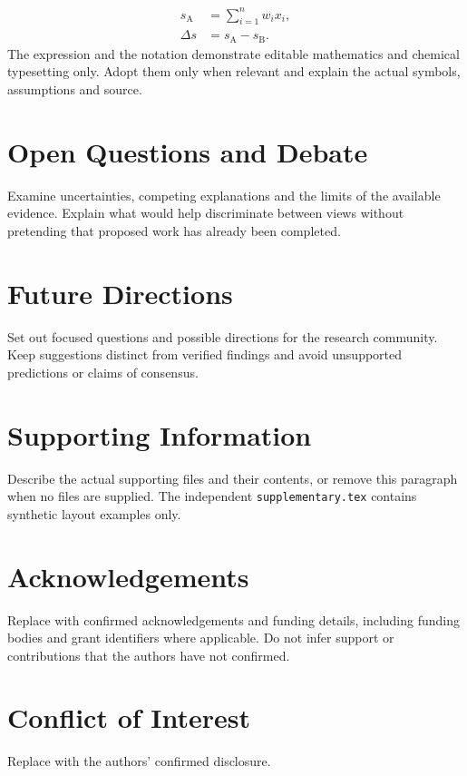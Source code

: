 \documentclass[a4paper,11pt]{article}
\begin{document}
\begin{equation}
\begin{split}
 s_{\mathrm{A}} &= \sum_{i=1}^{n} w_i x_i,\\
 \Delta s &= s_{\mathrm{A}}-s_{\mathrm{B}}.
\end{split}\label{eq:illustration}
\end{equation}
The expression and the notation  demonstrate editable mathematics
and chemical typesetting only. Adopt them only when relevant and explain
the actual symbols, assumptions and source.

\section{Open Questions and Debate}\label{sec:questions}
Examine uncertainties, competing explanations and the limits of the
available evidence. Explain what would help discriminate between views
without pretending that proposed work has already been completed.

\section{Future Directions}\label{sec:outlook}
Set out focused questions and possible directions for the research
community. Keep suggestions distinct from verified findings and avoid
unsupported predictions or claims of consensus.

\section*{Supporting Information}
Describe the actual supporting files and their contents, or remove this
paragraph when no files are supplied. The independent
\texttt{supplementary.tex} contains synthetic layout examples only.

\section*{Acknowledgements}
Replace with confirmed acknowledgements and funding details, including
funding bodies and grant identifiers where applicable. Do not infer support
or contributions that the authors have not confirmed.

\section*{Conflict of Interest}
Replace with the authors' confirmed disclosure.
\end{document}
